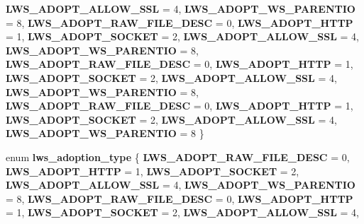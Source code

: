 \begin{DoxyCompactItemize}
{\bfseries L\+W\+S\+\_\+\+A\+D\+O\+P\+T\+\_\+\+A\+L\+L\+O\+W\+\_\+\+S\+SL} = 4, 
{\bfseries L\+W\+S\+\_\+\+A\+D\+O\+P\+T\+\_\+\+W\+S\+\_\+\+P\+A\+R\+E\+N\+T\+IO} = 8, 
{\bfseries L\+W\+S\+\_\+\+A\+D\+O\+P\+T\+\_\+\+R\+A\+W\+\_\+\+F\+I\+L\+E\+\_\+\+D\+E\+SC} = 0, 
\newline
{\bfseries L\+W\+S\+\_\+\+A\+D\+O\+P\+T\+\_\+\+H\+T\+TP} = 1, 
{\bfseries L\+W\+S\+\_\+\+A\+D\+O\+P\+T\+\_\+\+S\+O\+C\+K\+ET} = 2, 
{\bfseries L\+W\+S\+\_\+\+A\+D\+O\+P\+T\+\_\+\+A\+L\+L\+O\+W\+\_\+\+S\+SL} = 4, 
{\bfseries L\+W\+S\+\_\+\+A\+D\+O\+P\+T\+\_\+\+W\+S\+\_\+\+P\+A\+R\+E\+N\+T\+IO} = 8, 
\newline
{\bfseries L\+W\+S\+\_\+\+A\+D\+O\+P\+T\+\_\+\+R\+A\+W\+\_\+\+F\+I\+L\+E\+\_\+\+D\+E\+SC} = 0, 
{\bfseries L\+W\+S\+\_\+\+A\+D\+O\+P\+T\+\_\+\+H\+T\+TP} = 1, 
{\bfseries L\+W\+S\+\_\+\+A\+D\+O\+P\+T\+\_\+\+S\+O\+C\+K\+ET} = 2, 
{\bfseries L\+W\+S\+\_\+\+A\+D\+O\+P\+T\+\_\+\+A\+L\+L\+O\+W\+\_\+\+S\+SL} = 4, 
\newline
{\bfseries L\+W\+S\+\_\+\+A\+D\+O\+P\+T\+\_\+\+W\+S\+\_\+\+P\+A\+R\+E\+N\+T\+IO} = 8, 
{\bfseries L\+W\+S\+\_\+\+A\+D\+O\+P\+T\+\_\+\+R\+A\+W\+\_\+\+F\+I\+L\+E\+\_\+\+D\+E\+SC} = 0, 
{\bfseries L\+W\+S\+\_\+\+A\+D\+O\+P\+T\+\_\+\+H\+T\+TP} = 1, 
{\bfseries L\+W\+S\+\_\+\+A\+D\+O\+P\+T\+\_\+\+S\+O\+C\+K\+ET} = 2, 
\newline
{\bfseries L\+W\+S\+\_\+\+A\+D\+O\+P\+T\+\_\+\+A\+L\+L\+O\+W\+\_\+\+S\+SL} = 4, 
{\bfseries L\+W\+S\+\_\+\+A\+D\+O\+P\+T\+\_\+\+W\+S\+\_\+\+P\+A\+R\+E\+N\+T\+IO} = 8
 \}
\item 
\mbox{\label{group__sock-adopt_ga7e944a23efbb50187d34c62fb841d071}} 
enum {\bfseries lws\+\_\+adoption\+\_\+type} \{ \newline
{\bfseries L\+W\+S\+\_\+\+A\+D\+O\+P\+T\+\_\+\+R\+A\+W\+\_\+\+F\+I\+L\+E\+\_\+\+D\+E\+SC} = 0, 
{\bfseries L\+W\+S\+\_\+\+A\+D\+O\+P\+T\+\_\+\+H\+T\+TP} = 1, 
{\bfseries L\+W\+S\+\_\+\+A\+D\+O\+P\+T\+\_\+\+S\+O\+C\+K\+ET} = 2, 
{\bfseries L\+W\+S\+\_\+\+A\+D\+O\+P\+T\+\_\+\+A\+L\+L\+O\+W\+\_\+\+S\+SL} = 4, 
\newline
{\bfseries L\+W\+S\+\_\+\+A\+D\+O\+P\+T\+\_\+\+W\+S\+\_\+\+P\+A\+R\+E\+N\+T\+IO} = 8, 
{\bfseries L\+W\+S\+\_\+\+A\+D\+O\+P\+T\+\_\+\+R\+A\+W\+\_\+\+F\+I\+L\+E\+\_\+\+D\+E\+SC} = 0, 
{\bfseries L\+W\+S\+\_\+\+A\+D\+O\+P\+T\+\_\+\+H\+T\+TP} = 1, 
{\bfseries L\+W\+S\+\_\+\+A\+D\+O\+P\+T\+\_\+\+S\+O\+C\+K\+ET} = 2, 
\newline
{\bfseries L\+W\+S\+\_\+\+A\+D\+O\+P\+T\+\_\+\+A\+L\+L\+O\+W\+\_\+\+S\+SL} = 4, 

\end{DoxyCompactItemize}
